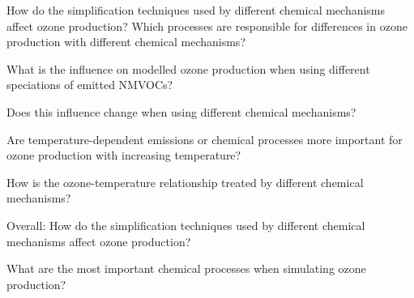 How do the simplification techniques used by different chemical mechanisms affect ozone production?
Which processes are responsible for differences in ozone production with different chemical mechanisms?

What is the influence on modelled ozone production when using different speciations of emitted NMVOCs?

Does this influence change when using different chemical mechanisms?

Are temperature-dependent emissions or chemical processes more important for ozone production with increasing temperature? 

How is the ozone-temperature relationship treated by different chemical mechanisms?

Overall:
How do the simplification techniques used by different chemical mechanisms affect ozone production?

What are the most important chemical processes when simulating ozone production?
